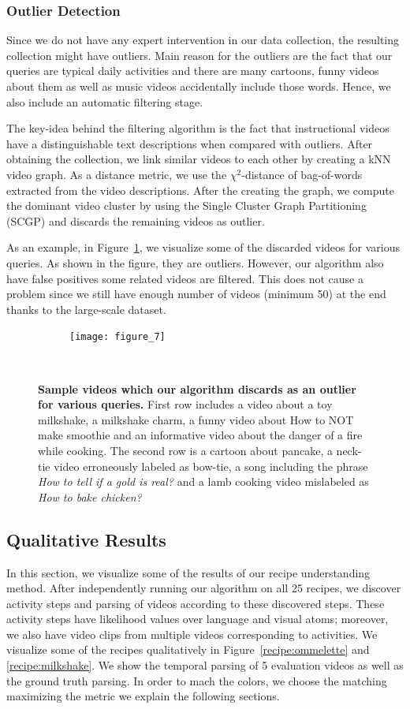 \subsubsection{Outlier Detection}
\label{filter}
Since we do not have any expert intervention in our data collection, the resulting collection might have outliers. Main reason for the outliers are  the fact that our queries are typical daily activities and there are many cartoons, funny videos about them as well as music videos accidentally include those words. Hence, we also include an automatic filtering stage.


The key-idea behind the filtering algorithm is the fact that instructional videos have a distinguishable text descriptions when compared with outliers. After obtaining the collection, we link similar videos to each other by creating a kNN video graph. As a distance metric, we use the $\chi^2$-distance of bag-of-words extracted from the video descriptions. After the creating the graph, we compute the dominant video cluster by using the Single Cluster Graph Partitioning (SCGP)\cite{scgp} and discards the remaining videos as outlier.

As an example, in Figure~\ref{outliers}, we visualize some of the discarded videos for various queries. As shown in the figure, they are outliers. However, our algorithm also have false positives \ie some related videos are filtered. This does not cause a problem since we still have enough number of videos (minimum 50) at the end thanks to the large-scale dataset. 
\begin{figure}[ht]
  \begin{subfigure}[b]{0.5\textwidth}
    \texttt{[image: figure\_7]}
  \end{subfigure}~

\caption{\textbf{Sample videos which our algorithm discards as an outlier for various queries.}
First row includes a video about a toy milkshake, a milkshake charm, a funny video about How to NOT make smoothie and an informative video about the danger of a fire while cooking. The second row is a cartoon about pancake, a neck-tie video erroneously labeled as bow-tie, a song including the phrase \emph{How to tell if a gold is real?} and a lamb cooking video mislabeled as \emph{How to bake chicken?}}
\label{outliers}
\end{figure}

\subsection{Qualitative Results}
In this section, we visualize some of  the results of our recipe understanding method. After independently running our algorithm on all 25 recipes, we discover activity steps and parsing of videos according to these discovered steps. These activity steps have likelihood values over language and visual atoms; moreover, we also have video clips from multiple videos corresponding to activities. We visualize some of the recipes qualitatively in Figure~\ref{recipe:ommelette} and \ref{recipe:milkshake}. We show the temporal parsing of 5 evaluation videos as well as the ground truth parsing. In order to mach the colors, we choose the matching maximizing the metric we explain the following sections.

